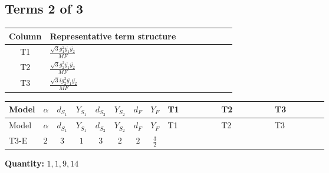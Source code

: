 \documentclass[8pt]{article}
\begin{document}
\begin{landscape}
\subsection*{Terms 2 of 3}
\begin{center}
\begin{tabular}{@{}c >{\raggedright\arraybackslash}p{0.82\linewidth}@{}}
\toprule
Column & Representative term structure \\
\midrule
T1 & \(\displaystyle \frac{\sqrt{3} g_{1}^{2} \overline{y_{1}} \overline{y_{2}}}{MF}\) \\
\midrule
T2 & \(\displaystyle \frac{\sqrt{3} g_{2}^{2} \overline{y_{1}} \overline{y_{2}}}{MF}\) \\
\midrule
T3 & \(\displaystyle \frac{\sqrt{3} i g_{2}^{2} \overline{y_{1}} \overline{y_{2}}}{MF}\) \\
\midrule
\bottomrule
\end{tabular}
\end{center}
\smallskip
\tiny
\begin{longtable}{@{}llcccccc >{\raggedright\arraybackslash}p{0.21\linewidth} >{\raggedright\arraybackslash}p{0.21\linewidth} >{\raggedright\arraybackslash}p{0.21\linewidth}@{}}
\toprule
Model & $\alpha$ & $d_{S_1}$ & $Y_{S_1}$ & $d_{S_2}$ & $Y_{S_2}$ & $d_F$ & $Y_F$ & T1 & T2 & T3 \\
\midrule
\endfirsthead
\toprule
Model & $\alpha$ & $d_{S_1}$ & $Y_{S_1}$ & $d_{S_2}$ & $Y_{S_2}$ & $d_F$ & $Y_F$ & T1 & T2 & T3 \\
\midrule
\endhead
T3-E & $2$ & $3$ & $1$ & $3$ & $2$ & $2$ & $\frac{3}{2}$ & \scriptsize\adjustbox{max width=\linewidth}{$\begin{gathered} \frac{9 \sqrt{3} g_{1}^{2} \overline{y_{1}} \overline{y_{2}}}{8 MF}\end{gathered}$} & \scriptsize\adjustbox{max width=\linewidth}{$\begin{gathered} \frac{49 \sqrt{3} g_{2}^{2} \overline{y_{1}} \overline{y_{2}}}{24 MF}\end{gathered}$} & \scriptsize\adjustbox{max width=\linewidth}{$\begin{gathered} - \frac{\sqrt{3} i g_{2}^{2} \overline{y_{1}} \overline{y_{2}}}{6 MF}\end{gathered}$} \\
\midrule
\bottomrule
\end{longtable}
\clearpage
\noindent\textbf{Quantity: }$\mathrm{1,1,9,14}$\par\smallskip

\end{landscape}
\end{document}
